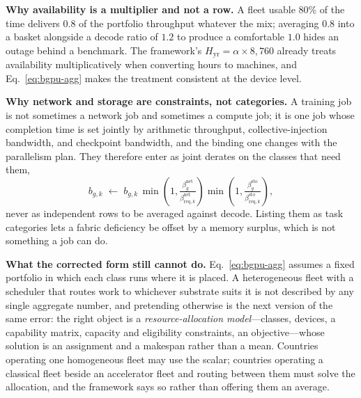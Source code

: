 \textbf{Why availability is a multiplier and not a row.} A fleet usable 80\% of the time delivers 0.8 of the portfolio throughput whatever the mix; averaging $0.8$ into a basket alongside a decode ratio of $1.2$ to produce a comfortable $1.0$ hides an outage behind a benchmark. The framework's $H_{\mathrm{yr}} = \alpha\times8{,}760$ already treats availability multiplicatively when converting hours to machines, and Eq.~\eqref{eq:bgpu-agg} makes the treatment consistent at the device level.

\textbf{Why network and storage are constraints, not categories.} A training job is not sometimes a network job and sometimes a compute job; it is one job whose completion time is set jointly by arithmetic throughput, collective-injection bandwidth, and checkpoint bandwidth, and the binding one changes with the parallelism plan. They therefore enter as joint derates on the classes that need them,
\[
b_{g,k} \;\longleftarrow\; b_{g,k}\,\min\!\left(1, \tfrac{\beta^{\mathrm{net}}_g}{\beta^{\mathrm{net}}_{\mathrm{req},k}}\right)\min\!\left(1, \tfrac{\beta^{\mathrm{sto}}_g}{\beta^{\mathrm{sto}}_{\mathrm{req},k}}\right),
\]
never as independent rows to be averaged against decode. Listing them as task categories lets a fabric deficiency be offset by a memory surplus, which is not something a job can do.

\textbf{What the corrected form still cannot do.} Eq.~\eqref{eq:bgpu-agg} assumes a fixed portfolio in which each class runs where it is placed. A heterogeneous fleet with a scheduler that routes work to whichever substrate suits it is not described by any single aggregate number, and pretending otherwise is the next version of the same error: the right object is a \emph{resource-allocation model}---classes, devices, a capability matrix, capacity and eligibility constraints, an objective---whose solution is an assignment and a makespan rather than a mean. Countries operating one homogeneous fleet may use the scalar; countries operating a classical fleet beside an accelerator fleet and routing between them must solve the allocation, and the framework says so rather than offering them an average.

